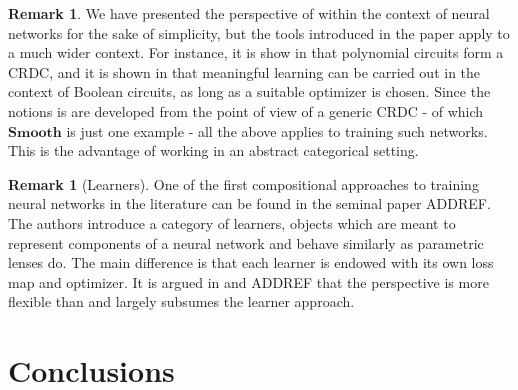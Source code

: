 \documentclass[12pt,a4paper,openright,twoside]{report}
\theoremstyle{plain}
\theoremstyle{definition}
\newtheorem{rem}[prop]{Remark}
\begin{document}
\begin{rem}
  We have presented the perspective of \cite{cruttwellDeepLearningParametric} within the context of neural networks for the sake of simplicity, but the tools introduced in the paper apply to a much wider context. For instance, it is show in \cite{wilsonCategoriesDifferentiablePolynomial2022} that polynomial circuits form a CRDC, and it is shown in \cite{wilsonReverseDerivativeAscent2021a} that meaningful learning can be carried out in the context of Boolean circuits, as long as a suitable optimizer is chosen. Since the notions is \cite{cruttwellDeepLearningParametric} are developed from the point of view of a generic CRDC - of which $\mathbf{Smooth}$ is just one example - all the above applies to training such networks. This is the advantage of working in an abstract categorical setting. 
\end{rem}


\begin{rem}[Learners]
  One of the first compositional approaches to training neural networks in the literature can be found in the seminal paper ADDREF. The authors introduce a category of learners, objects which are meant to represent components of a neural network and behave similarly as parametric lenses do. The main difference is that each learner is endowed with its own loss map and optimizer. It is argued in \cite{cruttwellDeepLearningParametric} and ADDREF that the perspective \cite{cruttwellDeepLearningParametric} is more flexible than and largely subsumes the learner approach. 
\end{rem}










\chapter*{Conclusions}
\end{document}
